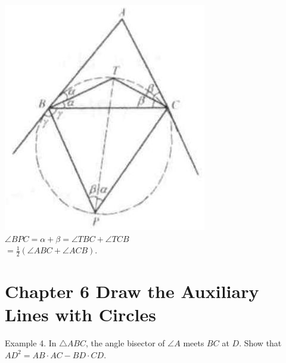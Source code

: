 \documentclass[10pt]{article}
\begin{document}
\includegraphics[max width=\textwidth, center]{2025_04_17_97bc1f7e44d93c271a88g-195(1)}\\
\(\angle B P C=\alpha+\beta=\angle T B C+\angle T C B\)\\
\(=\frac{1}{2}(\angle A B C+\angle A C B)\).

\section*{Chapter 6 Draw the Auxiliary Lines with Circles}
Example 4. In \(\triangle A B C\), the angle bisector of \(\angle A\) meets \(B C\) at \(D\). Show that \(A D^{2}=A B \cdot A C-B D \cdot C D\).
\end{document}
